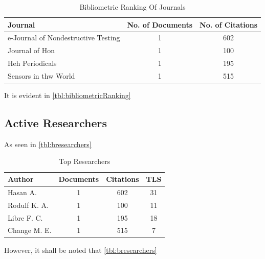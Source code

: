 \documentclass[journal, a4paper]{IEEEtran}
\begin{document}
\begin{table}[htbp]

  \centering
  \caption{Bibliometric Ranking Of Journals}
  \label{tbl:bibliometricRanking}
  \begin{tabular}{lcc}

      \toprule
      \textbf{Journal} & \textbf{No. of Documents} & \textbf{No. of Citations} \\
      \midrule
      e-Journal of Nondestructive Testing                   & 1     & 602   \\
      Journal of Hon                                        & 1     & 100   \\
      Heh Periodicals                                       & 1     & 195   \\
      Sensors in thw World                                  & 1     & 515   \\
      \bottomrule
  \end{tabular}
\end{table}

It is evident in \autoref{tbl:bibliometricRanking} \lipsum[1]


\subsection{Active Researchers}
As seen in \autoref{tbl:bresearchers} \lipsum[1]

\begin{table}[htbp]

  \centering
  \caption{Top Researchers}
  \label{tbl:bresearchers}
  \begin{tabular}{lccc}

      \toprule
      \textbf{Author} & \textbf{Documents} & \textbf{Citations} & \textbf{TLS} \\
      \midrule
      Hasan A.                   & 1     & 602   &  31         \\
      Rodulf K. A.               & 1     & 100   &  11         \\
      Libre F. C.                & 1     & 195   &  18         \\
      Change M. E.               & 1     & 515   &  7          \\
      \bottomrule
  \end{tabular}
\end{table}

However, it shall be noted that \autoref{tbl:bresearchers} \lipsum[1]\lipsum[1]
\end{document}
